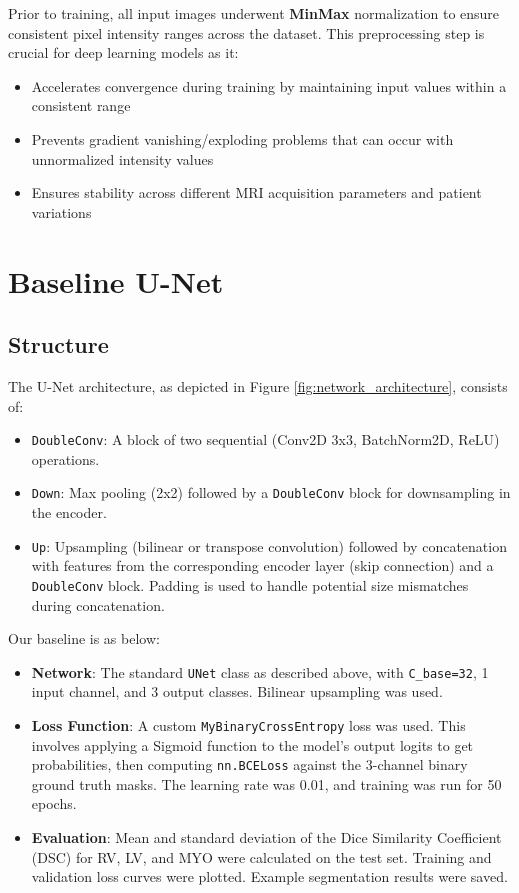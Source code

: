 \documentclass{article}
\begin{document}
Prior to training, all input images underwent \textbf{MinMax} normalization to ensure consistent pixel intensity ranges across the dataset. This preprocessing step is crucial for deep learning models as it:
\begin{itemize}
  \item Accelerates convergence during training by maintaining input values within a consistent range
  \item Prevents gradient vanishing/exploding problems that can occur with unnormalized intensity values
  \item Ensures stability across different MRI acquisition parameters and patient variations
\end{itemize}

\section{Baseline U-Net}

\subsection{Structure}
The U-Net architecture, as depicted in Figure \ref{fig:network_architecture}, consists of:
\begin{itemize}
  \item \texttt{DoubleConv}: A block of two sequential (Conv2D 3x3, BatchNorm2D, ReLU) operations.
  \item \texttt{Down}: Max pooling (2x2) followed by a \texttt{DoubleConv} block for downsampling in the encoder.
  \item \texttt{Up}: Upsampling (bilinear or transpose convolution) followed by concatenation with features from the
        corresponding encoder layer (skip connection) and a \texttt{DoubleConv} block. Padding is used to handle potential
        size mismatches during concatenation.
\end{itemize}

Our baseline is as below:
\begin{itemize}
  \item \textbf{Network}: The standard \texttt{UNet} class as described above, with \texttt{C\_base=32}, 1 input channel,
        and 3 output classes. Bilinear upsampling was used.
  \item \textbf{Loss Function}: A custom \texttt{MyBinaryCrossEntropy} loss was used. This involves applying a Sigmoid
        function to the model's output logits to get probabilities, then computing \texttt{nn.BCELoss} against the 3-channel
        binary ground truth masks. The learning rate was 0.01, and training was run for 50 epochs.
  \item \textbf{Evaluation}: Mean and standard deviation of the Dice Similarity Coefficient (DSC) for RV, LV, and MYO
        were calculated on the test set. Training and validation loss curves were plotted.
        Example segmentation results were saved.
\end{itemize}
\end{document}
